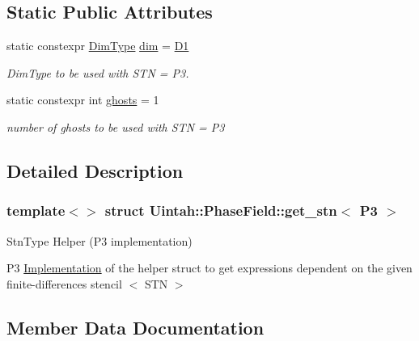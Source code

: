 \subsection*{Static Public Attributes}
\begin{DoxyCompactItemize}
\item 
static constexpr \hyperlink{namespaceUintah_1_1PhaseField_a12bfc68444894dffdf0cb8d9cf0cc76a}{Dim\+Type} \hyperlink{structUintah_1_1PhaseField_1_1get__stn_3_01P3_01_4_a7a2d8a40f67eaaa2518bf7f799a4142d}{dim} = \hyperlink{namespaceUintah_1_1PhaseField_a12bfc68444894dffdf0cb8d9cf0cc76aa24dcc0ba6bcb45bc6f503b1b538c6809}{D1}
\begin{DoxyCompactList}\small\item\em Dim\+Type to be used with S\+TN = P3. \end{DoxyCompactList}\item 
static constexpr int \hyperlink{structUintah_1_1PhaseField_1_1get__stn_3_01P3_01_4_a87bd650f62b718e5a353eb64ed5309b6}{ghosts} = 1
\begin{DoxyCompactList}\small\item\em number of ghosts to be used with S\+TN = P3 \end{DoxyCompactList}\end{DoxyCompactItemize}


\subsection{Detailed Description}
\subsubsection*{template$<$$>$\newline
struct Uintah\+::\+Phase\+Field\+::get\+\_\+stn$<$ P3 $>$}

Stn\+Type Helper (P3 implementation) 

P3 \hyperlink{classUintah_1_1PhaseField_1_1Implementation}{Implementation} of the helper struct to get expressions dependent on the given finite-\/differences stencil $<$ S\+TN $>$ 

\subsection{Member Data Documentation}
\mbox{\label{structUintah_1_1PhaseField_1_1get__stn_3_01P3_01_4_a7a2d8a40f67eaaa2518bf7f799a4142d}} 
